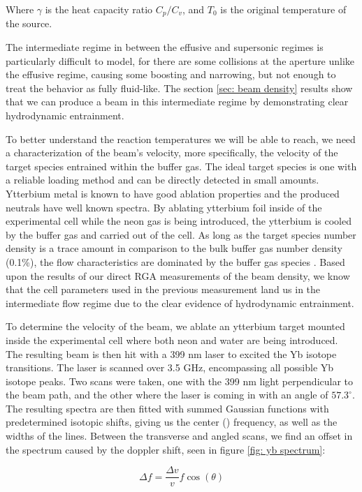 Where $\gamma$ is the heat capacity ratio $C_p/C_v$, and $T_0$ is the original temperature of the source.

The intermediate regime in between the effusive and supersonic regimes is particularly difficult to model, for there are some collisions at the aperture unlike the effusive regime, causing some boosting and narrowing, but not enough to treat the behavior as fully fluid-like. The section \ref{sec: beam density} results show that we can produce a beam in this intermediate regime by demonstrating clear hydrodynamic entrainment.

To better understand the reaction temperatures we will be able to reach, we need a characterization of the beam's velocity, more specifically, the velocity of the target species entrained within the buffer gas. The ideal target species is one with a reliable loading method and can be directly detected in small amounts. Ytterbium metal is known to have good ablation properties and the produced neutrals have well known spectra. By ablating ytterbium foil inside of the experimental cell while the neon gas is being introduced, the ytterbium is cooled by the buffer gas and carried out of the cell. As long as the target species number density is a trace amount in comparison to the bulk buffer gas number density (0.1\%), the flow characteristics are dominated by the buffer gas species \cite{Hutzler2012}. Based upon the results of our direct RGA measurements of the beam density, we know that the cell parameters used in the previous measurement land us in the intermediate flow regime due to the clear evidence of hydrodynamic entrainment.

To determine the velocity of the beam, we ablate an ytterbium target mounted inside the experimental cell where both neon and water are being introduced. The resulting beam is then hit with a 399 nm laser to excited the Yb isotope transitions. The laser is scanned over 3.5 GHz, encompassing all possible Yb isotope peaks. Two scans were taken, one with the 399 nm light perpendicular to the beam path, and the other where the laser is coming in with an angle of $57.3^\circ$. The resulting spectra are then fitted with summed Gaussian functions with predetermined isotopic shifts, giving us the center () frequency, as well as the widths of the lines. Between the transverse and angled scans, we find an offset in the spectrum caused by the doppler shift, seen in figure \ref{fig: yb spectrum}:

\begin{equation}
	\Delta f = \frac{\Delta v}{v} f \cos(\theta)
	\label{eq: doppler}
\end{equation}

